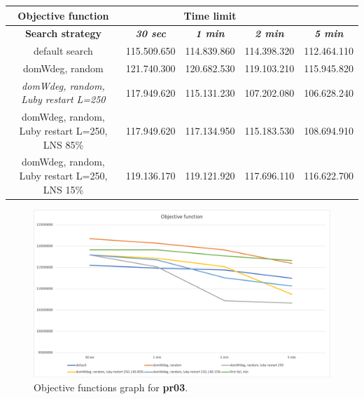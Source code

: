 {
\renewcommand{\arraystretch}{2}
\begin{longtable}[h]{| c | c | c | c | c |}
    \hline
    \textbf{Objective function} & \multicolumn{3}{c}{\textbf{Time limit}} & \\
    \hline
    \textbf{Search strategy} & \textbf{\textit{30 sec}} & \textbf{\textit{1 min}} & \textbf{\textit{2 min}} & \textbf{\textit{5 min}} \\
    \hline
    \endhead
    default search                                & 115.509.650 & 114.839.860 & 114.398.320 & 112.464.110 \\
    \hline
    domWdeg, random                               & 121.740.300 & 120.682.530 & 119.103.210 & 115.945.820 \\
    \hline
    \textit{domWdeg, random, Luby restart L=250}  & 117.949.620 & 115.131.230 & 107.202.080 & 106.628.240 \\
    \hline
    domWdeg, random, Luby restart L=250, LNS 85\% & 117.949.620 & 117.134.950 & 115.183.530 & 108.694.910 \\
    \hline
    domWdeg, random, Luby restart L=250, LNS 15\% & 119.136.170 & 119.121.920 & 117.696.110 & 116.622.700 \\
    \hline
\end{longtable}
}
\begin{figure}[H]
    \centering
    \includegraphics[width=0.8\columnwidth]{../graphs/pr03-objf.png}
    \caption{Objective functions graph for \textbf{pr03}.}
\end{figure}

